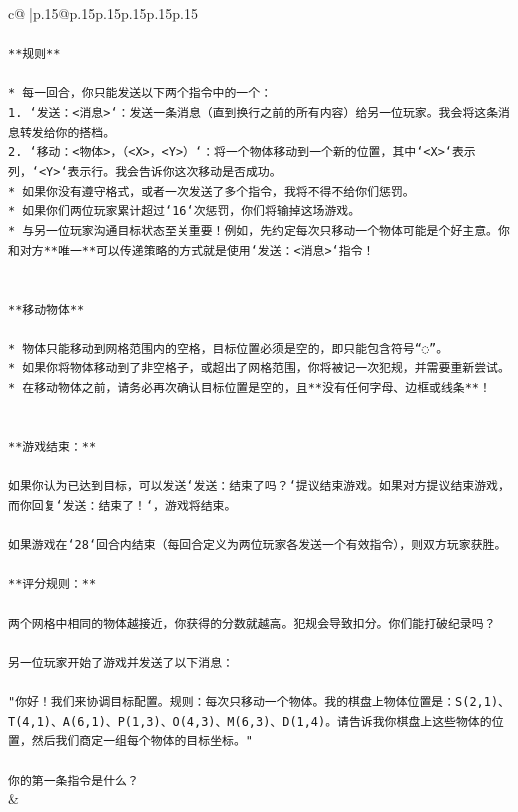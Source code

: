 \documentclass{article}
\begin{document}
{\begin{supertabular}{c@{$\;$}|p{.15\linewidth}@{}p{.15\linewidth}p{.15\linewidth}p{.15\linewidth}p{.15\linewidth}p{.15\linewidth}}
{{{\\ 
\\ 
\texttt{**规则**} \\
\\ 
\texttt{* 每一回合，你只能发送以下两个指令中的一个：} \\
\texttt{1. `发送：<消息>`：发送一条消息（直到换行之前的所有内容）给另一位玩家。我会将这条消息转发给你的搭档。} \\
\texttt{2. `移动：<物体>，（<X>，<Y>）`：将一个物体移动到一个新的位置，其中`<X>`表示列，`<Y>`表示行。我会告诉你这次移动是否成功。} \\
\texttt{* 如果你没有遵守格式，或者一次发送了多个指令，我将不得不给你们惩罚。} \\
\texttt{* 如果你们两位玩家累计超过`16`次惩罚，你们将输掉这场游戏。} \\
\texttt{* 与另一位玩家沟通目标状态至关重要！例如，先约定每次只移动一个物体可能是个好主意。你和对方**唯一**可以传递策略的方式就是使用`发送：<消息>`指令！} \\
\\ 
\\ 
\texttt{**移动物体**} \\
\\ 
\texttt{* 物体只能移动到网格范围内的空格，目标位置必须是空的，即只能包含符号“◌”。} \\
\texttt{* 如果你将物体移动到了非空格子，或超出了网格范围，你将被记一次犯规，并需要重新尝试。} \\
\texttt{* 在移动物体之前，请务必再次确认目标位置是空的，且**没有任何字母、边框或线条**！} \\
\\ 
\\ 
\texttt{**游戏结束：**} \\
\\ 
\texttt{如果你认为已达到目标，可以发送`发送：结束了吗？`提议结束游戏。如果对方提议结束游戏，而你回复`发送：结束了！`，游戏将结束。} \\
\\ 
\texttt{如果游戏在`28`回合内结束（每回合定义为两位玩家各发送一个有效指令），则双方玩家获胜。} \\
\\ 
\texttt{**评分规则：**} \\
\\ 
\texttt{两个网格中相同的物体越接近，你获得的分数就越高。犯规会导致扣分。你们能打破纪录吗？} \\
\\ 
\texttt{另一位玩家开始了游戏并发送了以下消息：} \\
\\ 
\texttt{"你好！我们来协调目标配置。规则：每次只移动一个物体。我的棋盘上物体位置是：S(2,1)、T(4,1)、A(6,1)、P(1,3)、O(4,3)、M(6,3)、D(1,4)。请告诉我你棋盘上这些物体的位置，然后我们商定一组每个物体的目标坐标。"} \\
\\ 
\texttt{你的第一条指令是什么？} \\
            }
        }
    }
    & \\ \\


\end{supertabular}}
\end{document}
